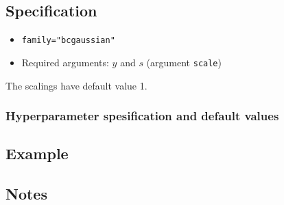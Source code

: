 \documentclass[a4paper,11pt]{article}
\begin{document}
\subsection*{Specification}

\begin{itemize}
\item \texttt{family="bcgaussian"}
\item Required arguments: $y$ and $s$ (argument \texttt{scale})
\end{itemize}
The scalings have default value 1.

\subsubsection*{Hyperparameter spesification and default values}


\subsection*{Example}



\subsection*{Notes}
\end{document}
